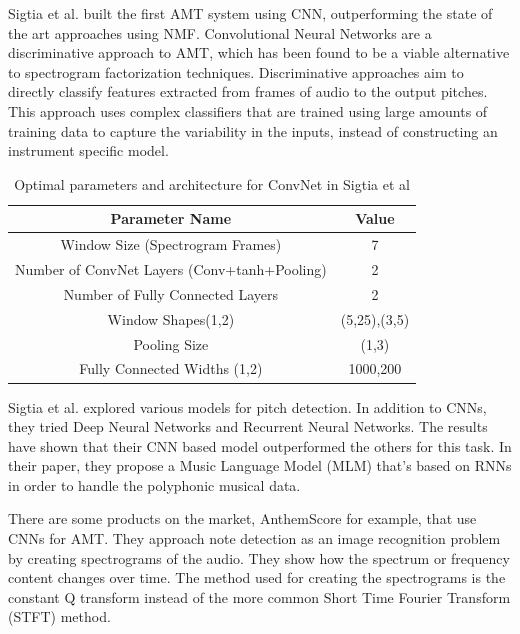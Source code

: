 Sigtia et al.\cite{REF:10} built the first AMT system using CNN, outperforming the state of the art approaches using NMF. Convolutional
Neural Networks are a discriminative approach to AMT, which has been found to be a
viable alternative to spectrogram factorization techniques. Discriminative approaches
aim to directly classify features extracted from frames of audio to the output pitches.
This approach uses complex classifiers that are trained using large amounts of training
data to capture the variability in the inputs, instead of constructing an instrument
specific model. 
\par

\begin{table} [h!]
	\centering
	\caption{Optimal parameters and architecture for ConvNet in Sigtia et al \cite{REF:7}}
	\begin{tabular}{ |c|c| } 
		\hline
		Parameter Name & Value \\ \hline
		Window Size (Spectrogram Frames) &  7 \\ \hline
		Number of ConvNet Layers (Conv+tanh+Pooling) & 2 \\ \hline
		Number of Fully Connected Layers & 2 \\ \hline
		Window Shapes(1,2) & (5,25),(3,5) \\ \hline
		Pooling Size & (1,3) \\ \hline
		Fully Connected Widths (1,2) & 1000,200 \\
		\hline
	\end{tabular}
	\label{table:sigtia}
\end{table}

Sigtia et al. \cite{REF:10} explored various models for pitch detection. In addition to CNNs, they tried Deep Neural Networks and Recurrent Neural Networks. The results have shown that their CNN based model outperformed the others for this task. In their paper, they propose a Music Language Model (MLM) that's based on RNNs in order to handle the polyphonic musical data. \cite{benetos}
\par

There are some products on the market, AnthemScore for example, that use CNNs for AMT. They approach note detection as an image recognition problem by creating spectrograms of the audio. They show how the spectrum or frequency content changes over time. The method used for creating the spectrograms is the constant Q transform instead of the more common Short Time Fourier Transform (STFT) method.
\par



